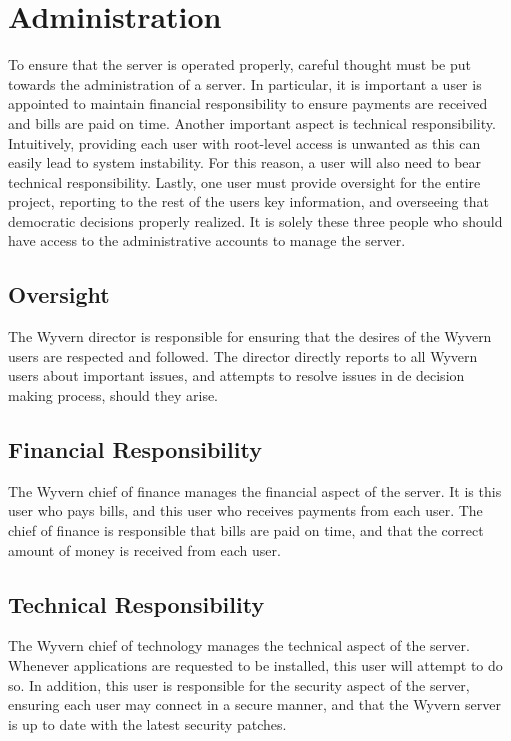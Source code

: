 \section{Administration}
\label{sec:administration}
To ensure that the server is operated properly, careful thought must be put towards the administration of a server. In particular, it is important a user is appointed to maintain financial responsibility to ensure payments are received and bills are paid on time. Another important aspect is technical responsibility. Intuitively, providing each user with root-level access is unwanted as this can easily lead to system instability. For this reason, a user will also need to bear technical responsibility. Lastly, one user must provide oversight for the entire project, reporting to the rest of the users key information, and overseeing that democratic decisions properly realized. It is solely these three people who should have access to the administrative accounts to manage the server.

\subsection{Oversight}
The Wyvern director is responsible for ensuring that the desires of the Wyvern users are respected and followed. The director directly reports to all Wyvern users about important issues, and attempts to resolve issues in de decision making process, should they arise.

\subsection{Financial Responsibility}
The Wyvern chief of finance manages the financial aspect of the server. It is this user who pays bills, and this user who receives payments from each user. The chief of finance is responsible that bills are paid on time, and that the correct amount of money is received from each user.

\subsection{Technical Responsibility}
The Wyvern chief of technology manages the technical aspect of the server. Whenever applications are requested to be installed, this user will attempt to do so. In addition, this user is responsible for the security aspect of the server, ensuring each user may connect in a secure manner, and that the Wyvern server is up to date with the latest security patches.
